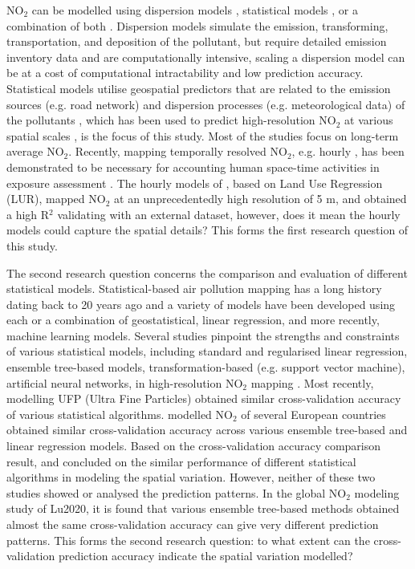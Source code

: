 \documentclass{article}
\begin{document}
NO$_2$ can be modelled using dispersion models \citep{holmes2006review,health2010traffic}, statistical models \citep{chen2019comparison}, or a combination of both \citep{molter2010modelling,marshall2008within,beelen2010comparison,dijkema2010comparison, akita2014large}. Dispersion models simulate the emission, transforming, transportation, and deposition of the pollutant, but require detailed emission inventory data and are computationally intensive, scaling a dispersion model can be at a cost of computational intractability and low prediction accuracy. Statistical models utilise geospatial predictors that are related to the emission sources (e.g. road network) and dispersion processes (e.g. meteorological data) of the pollutants \citep{briggs2000regression}, which has been used to predict high-resolution NO$_2$ at various spatial scales  \citep{Hoek2008,larkin2017global}, is the focus of this study. Most of the studies focus on long-term average NO$_2$. Recently, mapping temporally resolved NO$_2$, e.g. hourly \citep{lu2020land}, has been demonstrated to be necessary for accounting human space-time activities in exposure assessment \citep{lu2019}. The hourly models of \cite{lu2020land}, based on Land Use Regression (LUR), mapped NO$_2$ at an unprecedentedly high resolution of 5 m, and obtained a high R$^2$ validating with an external dataset, however, does it mean the hourly models could capture the spatial details? This forms the first research question of this study. 

The second research question concerns the comparison and evaluation of different statistical models. Statistical-based air pollution mapping has a long history dating back to 20 years ago \cite{briggs2000regression} and a variety of models have been developed using each or a combination of geostatistical, linear regression, and more recently, machine learning models. Several studies pinpoint the strengths and constraints of various statistical models, including standard and regularised linear regression, ensemble tree-based models, transformation-based (e.g. support vector machine), artificial neural networks, in high-resolution NO$_2$ mapping \citep{chen2019comparison, kerckhoffs2019performance, adam2014spatiotemporal, DEHOOGH2014382}. Most recently, \cite{kerckhoffs2019performance} modelling UFP (Ultra Fine Particles) obtained similar cross-validation accuracy of various statistical algorithms. \cite{chen2019comparison} modelled NO$_2$ of several European countries obtained similar cross-validation accuracy across various ensemble tree-based and linear regression models. Based on the cross-validation accuracy comparison result, \cite{chen2019comparison} and \cite{kerckhoffs2019performance} concluded on the similar performance of different statistical algorithms in modeling the spatial variation. However, neither of these two studies showed or analysed the prediction patterns. In the global NO$_2$ modeling study of Lu2020, it is found that various ensemble tree-based methods obtained almost the same cross-validation accuracy can give very different prediction patterns. This forms the second research question: to what extent can the cross-validation prediction accuracy indicate the spatial variation modelled? 
\end{document}
